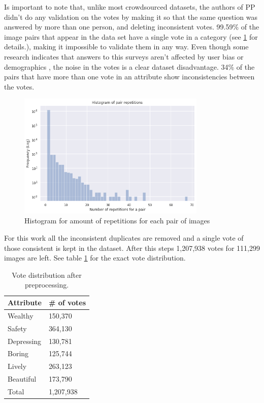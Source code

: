 Is important to note that, unlike most crowdsourced datasets, the authors of PP didn't
do any validation on the votes by making it so that the same question was answered by more than
one person, and deleting inconsistent votes. 99.59\% of the image pairs that appear in the
data set have a single vote in a category (see \ref{fig:rep_hist} for details.), making it impossible to validate them in any way.
Even though some research indicates that answers to this surveys aren't affected by user
bias or demographics \cite{hidalgo_inequality, costa_lisbon}, the noise in the votes is a
clear dataset disadvantage. 34\% of the  pairs that have more than one vote in an attribute
show inconsistencies between the votes.


\begin{figure}[ht]
	\begin{center}
	\includegraphics[width=0.8\textwidth]{./figures/rep_hist.png}
	\caption[Repetition histogram]{ Histogram for amount of repetitions for each pair of images }
	\label{fig:rep_hist}
	\end{center}
\end{figure}

For this work all the inconsistent duplicates are removed and a single vote of those consistent is kept
in the dataset. After this steps 1,207,938 votes for 111,299 images are left. See table \ref{tab:votes}
for the exact vote distribution.

\begin{table}[H]
	\begin{center}
	\caption[Votes Distribution]{ Vote distribution after preprocessing.}
	\begin{tabular}{ll}
		\hline
		\textbf{Attribute} & \textbf{\# of votes} \\ \hline
		Wealthy            & 150,370               \\
		Safety             & 364,130               \\
		Depressing         & 130,781               \\
		Boring             & 125,744               \\
		Lively             & 263,123               \\
		Beautiful          & 173,790               \\ \hline
		Total              & 1,207,938            \\
	\end{tabular}
	\label{tab:votes}
	\end{center}
\end{table}

